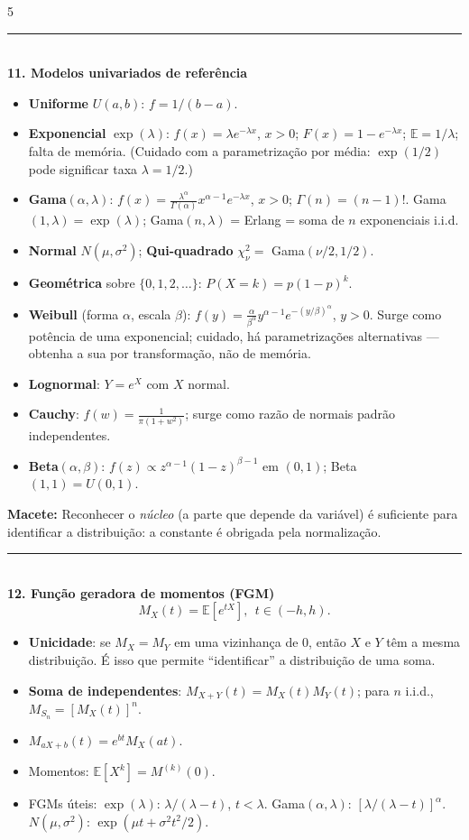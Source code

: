 \documentclass[a4paper,8pt]{extarticle}
\newcommand{\tit}[1]{\vspace{2pt}\textcolor{azul}{\rule{\linewidth}{0.6pt}}\\[1pt]\textbf{\textcolor{azul}{#1}}\\[1pt]}
\newcommand{\mac}[1]{\textcolor{verde}{\textbf{Macete:}} #1\par}
\newcommand{\E}{\mathbb{E}}
\begin{document}
\begin{multicols*}{5}
\tit{11. Modelos univariados de referência}
\begin{itemize}
\item \textbf{Uniforme} $U(a,b)$: $f=1/(b-a)$.
\item \textbf{Exponencial} $\exp(\lambda)$: $f(x)=\lambda e^{-\lambda x}$, $x>0$; $F(x)=1-e^{-\lambda x}$; $\E=1/\lambda$; falta de memória. (Cuidado com a parametrização por média: $\exp(1/2)$ pode significar taxa $\lambda=1/2$.)
\item \textbf{Gama}$(\alpha,\lambda)$: $f(x)=\frac{\lambda^{\alpha}}{\Gamma(\alpha)}x^{\alpha-1}e^{-\lambda x}$, $x>0$; $\Gamma(n)=(n-1)!$. Gama$(1,\lambda)=\exp(\lambda)$; Gama$(n,\lambda)$ = Erlang = soma de $n$ exponenciais i.i.d.
\item \textbf{Normal} $N(\mu,\sigma^2)$; \textbf{Qui-quadrado} $\chi^2_\nu=$ Gama$(\nu/2,1/2)$.
\item \textbf{Geométrica} sobre $\{0,1,2,\dots\}$: $P(X=k)=p(1-p)^k$.
\item \textbf{Weibull} (forma $\alpha$, escala $\beta$): $f(y)=\frac{\alpha}{\beta^{\alpha}}y^{\alpha-1}e^{-(y/\beta)^{\alpha}}$, $y>0$. Surge como potência de uma exponencial; cuidado, há parametrizações alternativas — obtenha a sua por transformação, não de memória.
\item \textbf{Lognormal}: $Y=e^{X}$ com $X$ normal.
\item \textbf{Cauchy}: $f(w)=\frac{1}{\pi(1+w^2)}$; surge como razão de normais padrão independentes.
\item \textbf{Beta}$(\alpha,\beta)$: $f(z)\propto z^{\alpha-1}(1-z)^{\beta-1}$ em $(0,1)$; Beta$(1,1)=U(0,1)$.
\end{itemize}
\mac{Reconhecer o \emph{núcleo} (a parte que depende da variável) é suficiente para identificar a distribuição: a constante é obrigada pela normalização.}

\tit{12. Função geradora de momentos (FGM)}
\[M_X(t)=\E[e^{tX}],\ \ t\in(-h,h).\]
\begin{itemize}
\item \textbf{Unicidade}: se $M_X=M_Y$ em uma vizinhança de 0, então $X$ e $Y$ têm a mesma distribuição. É isso que permite “identificar” a distribuição de uma soma.
\item \textbf{Soma de independentes}: $M_{X+Y}(t)=M_X(t)M_Y(t)$; para $n$ i.i.d., $M_{S_n}=[M_X(t)]^n$.
\item $M_{aX+b}(t)=e^{bt}M_X(at)$.
\item Momentos: $\E[X^k]=M^{(k)}(0)$.
\item FGMs úteis: $\exp(\lambda)$: $\lambda/(\lambda-t)$, $t<\lambda$. Gama$(\alpha,\lambda)$: $[\lambda/(\lambda-t)]^{\alpha}$. $N(\mu,\sigma^2)$: $\exp(\mu t+\sigma^2t^2/2)$.
\end{itemize}


\end{multicols*}
\end{document}
